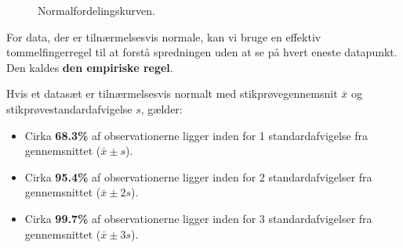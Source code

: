 \begin{figure}[htbp]
    \centering
    \caption{Normalfordelingskurven.}
    \label{fig:normal_curve_smooth}
\end{figure}

For data, der er tilnærmelsesvis normale, kan vi bruge en effektiv tommelfingerregel til at forstå spredningen uden at se på hvert eneste datapunkt. Den kaldes \textbf{den empiriske regel}.

\begin{theorem}
Hvis et datasæt er tilnærmelsesvis normalt med stikprøvegennemsnit $\bar{x}$ og stikprøvestandardafvigelse $s$, gælder:
\begin{itemize}
    \item Cirka \textbf{68.3\%} af observationerne ligger inden for 1 standardafvigelse fra gennemsnittet ($\bar{x} \pm s$).
    \item Cirka \textbf{95.4\%} af observationerne ligger inden for 2 standardafvigelser fra gennemsnittet ($\bar{x} \pm 2s$).
    \item Cirka \textbf{99.7\%} af observationerne ligger inden for 3 standardafvigelser fra gennemsnittet ($\bar{x} \pm 3s$).
\end{itemize}
\end{theorem}

